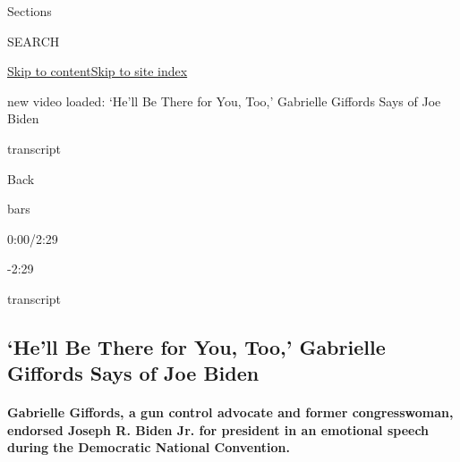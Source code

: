 Sections

SEARCH

\protect\hyperlink{site-content}{Skip to
content}\protect\hyperlink{site-index}{Skip to site index}

new video loaded: `He'll Be There for You, Too,' Gabrielle Giffords Says
of Joe Biden

transcript

Back

bars

0:00/2:29

-2:29

transcript

\hypertarget{hell-be-there-for-you-too-gabrielle-giffords-says-of-joe-biden}{%
\subsection{`He'll Be There for You, Too,' Gabrielle Giffords Says of
Joe
Biden}\label{hell-be-there-for-you-too-gabrielle-giffords-says-of-joe-biden}}

\hypertarget{gabrielle-giffords-a-gun-control-advocate-and-former-congresswoman-endorsed-joseph-r-biden-jr-for-president-in-an-emotional-speech-during-the-democratic-national-convention}{%
\paragraph{Gabrielle Giffords, a gun control advocate and former
congresswoman, endorsed Joseph R. Biden Jr. for president in an
emotional speech during the Democratic National
Convention.}\label{gabrielle-giffords-a-gun-control-advocate-and-former-congresswoman-endorsed-joseph-r-biden-jr-for-president-in-an-emotional-speech-during-the-democratic-national-convention}}

